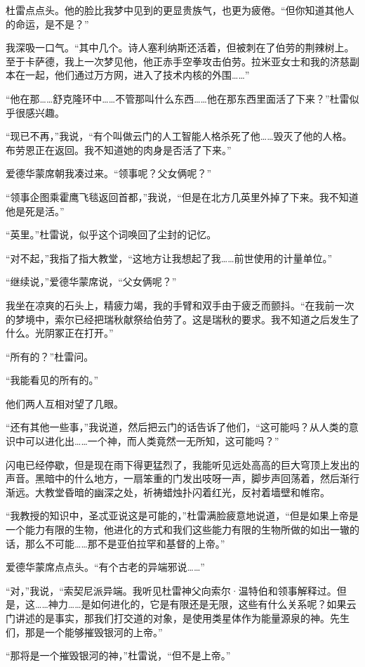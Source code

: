 \documentclass[AutoFakeBold=true]{book}
\begin{document}
杜雷点点头。他的脸比我梦中见到的更显贵族气，也更为疲倦。``但你知道其他人的命运，是不是？''

我深吸一口气。``其中几个。诗人塞利纳斯还活着，但被刺在了伯劳的荆辣树上。至于卡萨德，我上一次梦见他，他正赤手空拳攻击伯劳。拉米亚女士和我的济慈副本在一起，他们通过万方网，进入了技术内核的外围……''

``他在那……舒克隆环中……不管那叫什么东西……他在那东西里面活了下来？''杜雷似乎很感兴趣。

``现已不再，''我说，``有个叫做云门的人工智能人格杀死了他……毁灭了他的人格。布劳恩正在返回。我不知道她的肉身是否活了下来。''

爱德华蒙席朝我凑过来。``领事呢？父女俩呢？''

``领事企图乘霍鹰飞毯返回首都，''我说，``但是在北方几英里外掉了下来。我不知道他是死是活。''

``英里。''杜雷说，似乎这个词唤回了尘封的记忆。

``对不起，''我指了指大教堂，``这地方让我想起了我……前世使用的计量单位。''

``继续说，''爱德华蒙席说，``父女俩呢？''

我坐在凉爽的石头上，精疲力竭，我的手臂和双手由于疲乏而颤抖。``在我前一次的梦境中，索尔已经把瑞秋献祭给伯劳了。这是瑞秋的要求。我不知道之后发生了什么。光阴冢正在打开。''

``所有的？''杜雷问。

``我能看见的所有的。''

他们两人互相对望了几眼。

``还有其他一些事，''我说道，然后把云门的话告诉了他们，``这可能吗？从人类的意识中可以进化出……一个神，而人类竟然一无所知，这可能吗？''

闪电已经停歇，但是现在雨下得更猛烈了，我能听见远处高高的巨大穹顶上发出的声音。黑暗中的什么地方，一扇笨重的门发出吱呀一声，脚步声回荡着，然后渐行渐远。大教堂昏暗的幽深之处，祈祷蜡烛扑闪着红光，反衬着墙壁和帷帘。

``我教授的知识中，圣忒亚说这是可能的，''杜雷满脸疲意地说道，``但是如果上帝是一个能力有限的生物，他进化的方式和我们这些能力有限的生物所做的如出一辙的话，那么不可能……那不是亚伯拉罕和基督的上帝。''

爱德华蒙席点点头。``有个古老的异端邪说……''

``对，''我说，``索契尼派异端。我听见杜雷神父向索尔·温特伯和领事解释过。但是，这……神力……是如何进化的，它是有限还是无限，这些有什么关系呢？如果云门讲述的是事实，那我们打交道的对象，是使用类星体作为能量源泉的神。先生们，那是一个能够摧毁银河的上帝。''

``那将是一个摧毁银河的神，''杜雷说，``但不是上帝。''
\end{document}
